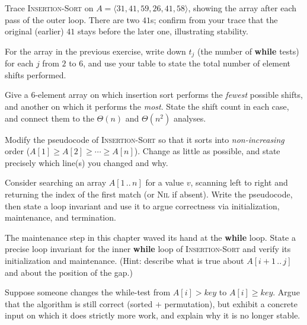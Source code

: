 \begin{exercise}
Trace \textsc{Insertion-Sort} on $A = \langle 31, 41, 59, 26, 41, 58 \rangle$, showing
the array after each pass of the outer loop. There are two $41$s; confirm from your
trace that the original (earlier) $41$ stays before the later one, illustrating
stability.
\end{exercise}

\begin{exercise}
For the array in the previous exercise, write down $t_j$ (the number of \textbf{while}
tests) for each $j$ from $2$ to $6$, and use your table to state the total number of
element shifts performed.
\end{exercise}

\begin{exercise}
Give a $6$-element array on which insertion sort performs the \emph{fewest} possible
shifts, and another on which it performs the \emph{most}. State the shift count in each
case, and connect them to the $\Theta(n)$ and $\Theta(n^2)$ analyses.
\end{exercise}

\begin{exercise}
Modify the pseudocode of \textsc{Insertion-Sort} so that it sorts into
\emph{non-increasing} order ($A[1] \ge A[2] \ge \cdots \ge A[n]$). Change as little as
possible, and state precisely which line(s) you changed and why.
\end{exercise}

\begin{exercise}
Consider searching an array $A[1\,..\,n]$ for a value $v$, scanning left to right and
returning the index of the first match (or \textsc{Nil} if absent). Write the
pseudocode, then state a loop invariant and use it to argue correctness via
initialization, maintenance, and termination.
\end{exercise}

\begin{exercise}
The maintenance step in this chapter waved its hand at the \textbf{while} loop. State a
precise loop invariant for the inner \textbf{while} loop of \textsc{Insertion-Sort} and
verify its initialization and maintenance. (Hint: describe what is true about
$A[i+1\,..\,j]$ and about the position of the gap.)
\end{exercise}

\begin{exercise}
Suppose someone changes the while-test from $A[i] > \mathit{key}$ to $A[i] \ge
\mathit{key}$. Argue that the algorithm is still correct (sorted $+$ permutation), but
exhibit a concrete input on which it does strictly more work, and explain why it is no
longer stable.
\end{exercise}

